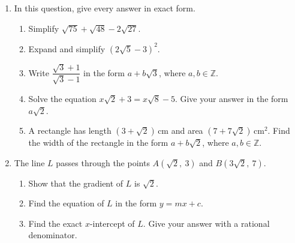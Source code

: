 \documentclass[12pt, twoside]{article}
\begin{document}
\begin{enumerate}[itemsep=0.15cm]

\newpage

\item[5.]
In this question, give every answer in exact form.

\begin{enumerate}[itemsep=0.1cm]
  \item Simplify $\sqrt{75} + \sqrt{48} - 2\sqrt{27}$.
  \item Expand and simplify $\left(2\sqrt{5} - 3\right)^{2}$.
  \item Write $\dfrac{\sqrt{3} + 1}{\sqrt{3} - 1}$ in the form
  $a + b\sqrt{3}$, where $a, b \in \mathbb{Z}$.
  \item Solve the equation $x\sqrt{2} + 3 = x\sqrt{8} - 5$. Give your
  answer in the form $a\sqrt{2}$.
  \item A rectangle has length $\left(3 + \sqrt{2}\right)\,\text{cm}$ and
  area $\left(7 + 7\sqrt{2}\right)\,\text{cm}^{2}$. Find the width of the
  rectangle in the form $a + b\sqrt{2}$, where $a, b \in \mathbb{Z}$.
\end{enumerate}


\newpage

\item[6.]
The line $L$ passes through the points $A\left(\sqrt{2},\ 3\right)$ and
$B\left(3\sqrt{2},\ 7\right)$.

\begin{enumerate}[itemsep=0.1cm]
  \item Show that the gradient of $L$ is $\sqrt{2}$.
  \item Find the equation of $L$ in the form $y = mx + c$.
  \item Find the exact $x$-intercept of $L$. Give your answer with a
  rational denominator.
\end{enumerate}


\end{enumerate}
\end{document}
